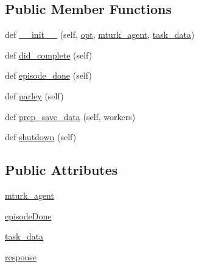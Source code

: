 \subsection*{Public Member Functions}
\begin{DoxyCompactItemize}
\item 
def \hyperlink{classparlai_1_1mturk_1_1core_1_1dev_1_1worlds_1_1StaticMTurkTaskWorld_aaa2fbb9c20a2a3fb4e7bb795ba2391fa}{\+\_\+\+\_\+init\+\_\+\+\_\+} (self, \hyperlink{classparlai_1_1core_1_1worlds_1_1World_a3640d92718acd3e6942a28c1ab3678bd}{opt}, \hyperlink{classparlai_1_1mturk_1_1core_1_1dev_1_1worlds_1_1StaticMTurkTaskWorld_aab38e48f7fd04122213d70e5b9c0786c}{mturk\+\_\+agent}, \hyperlink{classparlai_1_1mturk_1_1core_1_1dev_1_1worlds_1_1StaticMTurkTaskWorld_a18b4236bb2e5867aeb7a6d3c846712ac}{task\+\_\+data})
\item 
def \hyperlink{classparlai_1_1mturk_1_1core_1_1dev_1_1worlds_1_1StaticMTurkTaskWorld_a43d4e4711cd363ab8e018d856a4697e9}{did\+\_\+complete} (self)
\item 
def \hyperlink{classparlai_1_1mturk_1_1core_1_1dev_1_1worlds_1_1StaticMTurkTaskWorld_af6460dcb2a232ba0bd7ebfe8d386f5b6}{episode\+\_\+done} (self)
\item 
def \hyperlink{classparlai_1_1mturk_1_1core_1_1dev_1_1worlds_1_1StaticMTurkTaskWorld_a59a7b6fb3eea25c079ac36006311e1a0}{parley} (self)
\item 
def \hyperlink{classparlai_1_1mturk_1_1core_1_1dev_1_1worlds_1_1StaticMTurkTaskWorld_a5eb7b6e957de17b89a2e24c3d6fef751}{prep\+\_\+save\+\_\+data} (self, workers)
\item 
def \hyperlink{classparlai_1_1mturk_1_1core_1_1dev_1_1worlds_1_1StaticMTurkTaskWorld_a75fabb1fa04ac186143e76abd756f372}{shutdown} (self)
\end{DoxyCompactItemize}
\subsection*{Public Attributes}
\begin{DoxyCompactItemize}
\item 
\hyperlink{classparlai_1_1mturk_1_1core_1_1dev_1_1worlds_1_1StaticMTurkTaskWorld_aab38e48f7fd04122213d70e5b9c0786c}{mturk\+\_\+agent}
\item 
\hyperlink{classparlai_1_1mturk_1_1core_1_1dev_1_1worlds_1_1StaticMTurkTaskWorld_a9d5943473ba788a5bf6cf6f439d9a2b8}{episode\+Done}
\item 
\hyperlink{classparlai_1_1mturk_1_1core_1_1dev_1_1worlds_1_1StaticMTurkTaskWorld_a18b4236bb2e5867aeb7a6d3c846712ac}{task\+\_\+data}
\item 
\hyperlink{classparlai_1_1mturk_1_1core_1_1dev_1_1worlds_1_1StaticMTurkTaskWorld_ac6d8c12abc3a318337ab68b546631c79}{response}
\end{DoxyCompactItemize}



